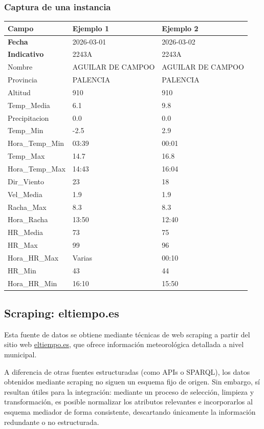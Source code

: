 \documentclass[12pt, a4paper]{article}
\begin{document}
\subsubsection*{Captura de una instancia}
\begin{center}
\begin{tabular}{|p{}|p{}|p{}|}
\hline
\textbf{Campo} & \textbf{Ejemplo 1} & \textbf{Ejemplo 2} \\
\hline
\textbf{Fecha} & 2026-03-01 & 2026-03-02 \\
\textbf{Indicativo} & 2243A & 2243A \\
Nombre & AGUILAR DE CAMPOO & AGUILAR DE CAMPOO \\
Provincia & PALENCIA & PALENCIA \\
Altitud & 910 & 910 \\
Temp\_Media & 6.1 & 9.8 \\
Precipitacion & 0.0 & 0.0 \\
Temp\_Min & -2.5 & 2.9 \\
Hora\_Temp\_Min & 03:39 & 00:01 \\
Temp\_Max & 14.7 & 16.8 \\
Hora\_Temp\_Max & 14:43 & 16:04 \\
Dir\_Viento & 23 & 18 \\
Vel\_Media & 1.9 & 1.9 \\
Racha\_Max & 8.3 & 8.3 \\
Hora\_Racha & 13:50 & 12:40 \\
HR\_Media & 73 & 75 \\
HR\_Max & 99 & 96 \\
Hora\_HR\_Max & Varias & 00:10 \\
HR\_Min & 43 & 44 \\
Hora\_HR\_Min & 16:10 & 15:50 \\
\hline
\end{tabular}
\end{center}

\subsection{Scraping: eltiempo.es}

Esta fuente de datos se obtiene mediante técnicas de web scraping a partir del sitio web \href{https://www.eltiempo.es}{eltiempo.es}, que ofrece información meteorológica detallada a nivel municipal.

A diferencia de otras fuentes estructuradas (como APIs o SPARQL), los datos obtenidos mediante scraping no siguen un esquema fijo de origen. 
Sin embargo, sí resultan útiles para la integración: mediante un proceso de selección, limpieza y transformación, es posible normalizar los atributos relevantes e incorporarlos al esquema mediador de forma consistente, descartando únicamente la información redundante o no estructurada.
\end{document}
